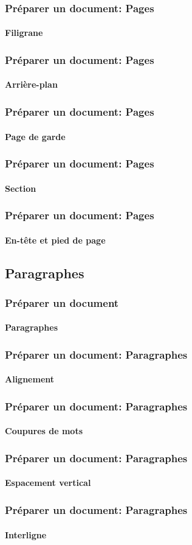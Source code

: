 \documentclass[xcolor=table]{beamer}
\begin{document}
\begin{frame}
\frametitle{Préparer un document: Pages}
\framesubtitle{Filigrane}

\end{frame}

\begin{frame}
\frametitle{Préparer un document: Pages}
\framesubtitle{Arrière-plan}

\end{frame}

\begin{frame}
\frametitle{Préparer un document: Pages}
\framesubtitle{Page de garde}

\end{frame}

\begin{frame}
\frametitle{Préparer un document: Pages}
\framesubtitle{Section}

\end{frame}

\begin{frame}
\frametitle{Préparer un document: Pages}
\framesubtitle{En-tête et pied de page}

\end{frame}


\subsection{Paragraphes}

\begin{frame}
\frametitle{Préparer un document}
\framesubtitle{Paragraphes}

\end{frame}

\begin{frame}
\frametitle{Préparer un document: Paragraphes}
\framesubtitle{Alignement}

\end{frame}

\begin{frame}
\frametitle{Préparer un document: Paragraphes}
\framesubtitle{Coupures de mots}

\end{frame}

\begin{frame}
\frametitle{Préparer un document: Paragraphes}
\framesubtitle{Espacement vertical}

\end{frame}

\begin{frame}
\frametitle{Préparer un document: Paragraphes}
\framesubtitle{Interligne}

\end{frame}
\end{document}
